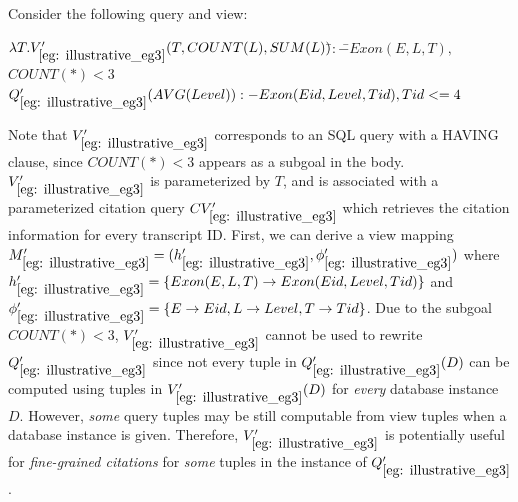 \begin{example} \label{eg: illustrative_eg3}
Consider the following query and view:
\begin{tabbing}
$\lambda T. V_{\ref{eg: illustrative_eg3}}'(T, COUNT(L), SUM(L))$\hspace{0.2em}\=$:-$\=$ Exon(E, L, T),$\\
\>\>$COUNT(*) < 3$\\
$Q_{\ref{eg: illustrative_eg3}}'(AVG(Level)) :- Exon(Eid, Level, Tid), Tid <= 4$
\end{tabbing}
Note that $V_{\ref{eg: illustrative_eg3}}'$ corresponds to an SQL query with a HAVING clause, since $COUNT(*) < 3$ appears as a subgoal in the body.  $V_{\ref{eg: illustrative_eg3}}'$ is parameterized by $T$, and is associated with a parameterized citation query $CV_{\ref{eg: illustrative_eg3}}'$ which retrieves the citation information for every transcript ID. First, we can derive a view mapping $M_{\ref{eg: illustrative_eg3}}' = (h_{\ref{eg: illustrative_eg3}}', \phi_{\ref{eg: illustrative_eg3}}')$ where $h_{\ref{eg: illustrative_eg3}}' =\{Exon(E, L, T) \rightarrow Exon(Eid, Level, Tid)\}$ and $\phi_{\ref{eg: illustrative_eg3}}' = \{E \rightarrow Eid, L \rightarrow Level, T \rightarrow Tid\}$.
Due to the subgoal $COUNT(*) < 3$, $V_{\ref{eg: illustrative_eg3}}'$ cannot be used to rewrite $Q_{\ref{eg: illustrative_eg3}}'$ since not every tuple in $Q_{\ref{eg: illustrative_eg3}}'(D)$ can be computed using tuples in $V_{\ref{eg: illustrative_eg3}}'(D)$
for \textit{every} database instance $D$.
However, \textit{some} query tuples may be still computable from view tuples when a database instance is given.
Therefore, 
$V_{\ref{eg: illustrative_eg3}}'$ is potentially useful for \textit{fine-grained citations} for \textit{some} tuples in the instance of $Q_{\ref{eg: illustrative_eg3}}'$.


\end{example}
